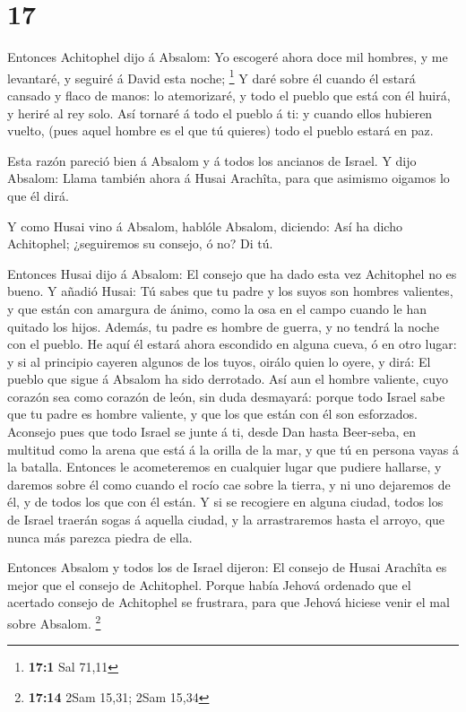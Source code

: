 \hypertarget{section-16}{%
\section{17}\label{section-16}}

 Entonces Achitophel dijo á Absalom: Yo escogeré ahora
doce mil hombres, y me levantaré, y seguiré á David esta noche;
\footnote{\textbf{17:1} Sal 71,11}  Y daré sobre él cuando
él estará cansado y flaco de manos: lo atemorizaré, y todo el pueblo que
está con él huirá, y heriré al rey solo.  Así tornaré á
todo el pueblo á ti: y cuando ellos hubieren vuelto, (pues aquel hombre
es el que tú quieres) todo el pueblo estará en paz.

 Esta razón pareció bien á Absalom y á todos los ancianos
de Israel.  Y dijo Absalom: Llama también ahora á Husai
Arachîta, para que asimismo oigamos lo que él dirá.

 Y como Husai vino á Absalom, hablóle Absalom, diciendo:
Así ha dicho Achitophel; ¿seguiremos su consejo, ó no? Di tú.

 Entonces Husai dijo á Absalom: El consejo que ha dado
esta vez Achitophel no es bueno.  Y añadió Husai: Tú sabes
que tu padre y los suyos son hombres valientes, y que están con amargura
de ánimo, como la osa en el campo cuando le han quitado los hijos.
Además, tu padre es hombre de guerra, y no tendrá la noche con el
pueblo.  He aquí él estará ahora escondido en alguna
cueva, ó en otro lugar: y si al principio cayeren algunos de los tuyos,
oirálo quien lo oyere, y dirá: El pueblo que sigue á Absalom ha sido
derrotado.  Así aun el hombre valiente, cuyo corazón sea
como corazón de león, sin duda desmayará: porque todo Israel sabe que tu
padre es hombre valiente, y que los que están con él son esforzados.
 Aconsejo pues que todo Israel se junte á ti, desde Dan
hasta Beer-seba, en multitud como la arena que está á la orilla de la
mar, y que tú en persona vayas á la batalla.  Entonces le
acometeremos en cualquier lugar que pudiere hallarse, y daremos sobre él
como cuando el rocío cae sobre la tierra, y ni uno dejaremos de él, y de
todos los que con él están.  Y si se recogiere en alguna
ciudad, todos los de Israel traerán sogas á aquella ciudad, y la
arrastraremos hasta el arroyo, que nunca más parezca piedra de ella.

 Entonces Absalom y todos los de Israel dijeron: El
consejo de Husai Arachîta es mejor que el consejo de Achitophel. Porque
había Jehová ordenado que el acertado consejo de Achitophel se
frustrara, para que Jehová hiciese venir el mal sobre Absalom.
\footnote{\textbf{17:14} 2Sam 15,31; 2Sam 15,34}

